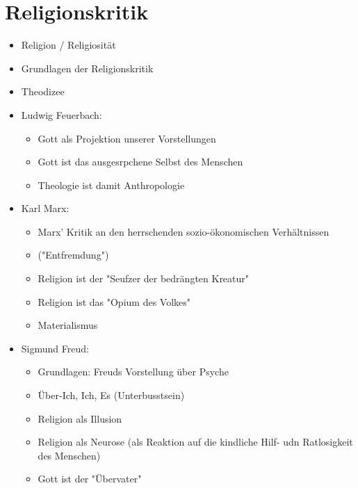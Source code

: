 
\section{Religionskritik}

\begin{itemize}
    \item Religion / Religiosität
    \item Grundlagen der Religionskritik
    \item Theodizee
\end{itemize}

\begin{itemize}
    \item Ludwig  Feuerbach:
    \begin{itemize}
        \item Gott als Projektion unserer Vorstellungen
        \item Gott ist das ausgesrpchene Selbst des Menschen
        \item Theologie ist damit Anthropologie
    \end{itemize}
    \item Karl Marx:
    \begin{itemize}
        \item Marx' Kritik an den herrschenden sozio-ökonomischen Verhältnissen
        \item ("Entfremdung")
        \item Religion ist der "Seufzer der bedrängten Kreatur"
        \item Religion ist das "Opium des Volkes"
        \item Materialismus
    \end{itemize}
    \item Sigmund Freud:
    \begin{itemize}
        \item Grundlagen: Freuds Vorstellung über Psyche 
        \item Über-Ich, Ich, Es (Unterbusstsein)
        \item Religion als Illusion
        \item Religion als Neurose (als Reaktion auf die kindliche Hilf- udn Ratlosigkeit des Menschen) 
        \item Gott ist der "Übervater"
    \end{itemize}
\end{itemize}
